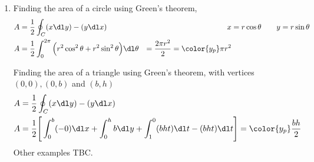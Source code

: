 \begin{enumerate}
    \item Finding the area of a circle using Green's theorem,
          \begin{align}
              A & = \frac{1}{2} \oint_C (x \dl y) - (y \dl x)                       &
              x & = r\cos \theta \qquad y = r \sin \theta                             \\
              A & = \frac{1}{2} \int_{0}^{2\pi} \Big(r^2 \cos^2 \theta + r^2 \sin^2
              \theta\Big) \dl \theta
                & = \frac{2\pi r^2}{2} = \color{y_p} \pi r^2
          \end{align}

          Finding the area of a triangle using Green's theorem, with vertices
          $ (0,0), (0, b) $ and $ (b, h) $
          \begin{align}
              A & = \frac{1}{2} \oint_C (x \dl y) - (y \dl x)     \\
              A & = \frac{1}{2} \Bigg[ \int_{0}^{b} (-0) \dl x  +
                  \int_{0}^{h} b \dl y + \int_{1}^{0} (bht) \dl t - (bht) \dl t \Bigg]
              = \color{y_p} \frac{bh}{2}
          \end{align}
          Other examples TBC.


\end{enumerate}
